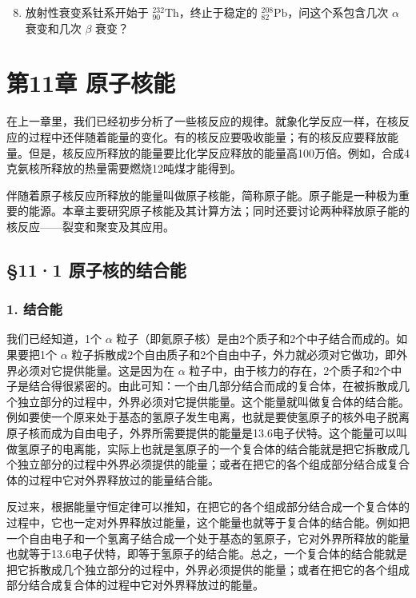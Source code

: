 \begin{enumerate}
\setcounter{enumi}{7}
\item
  放射性衰变系钍系开始于 \(^{232}_{90}\mathrm{Th}\)，终止于稳定的
  \(^{208}_{82}\mathrm{Pb}\)，问这个系包含几次 \(\alpha\) 衰变和几次
  \(\beta\) 衰变？
\end{enumerate}

\chapter{第11章 原子核能}

在上一章里，我们已经初步分析了一些核反应的规律。就象化学反应一样，在核反应的过程中还伴随着能量的变化。有的核反应要吸收能量；有的核反应要释放能量。但是，核反应所释放的能量要比化学反应释放的能量高100万倍。例如，合成4克氨核所释放的热量需要燃烧12吨煤才能得到。

伴随着原子核反应所释放的能量叫做原子核能，简称原子能。原子能是一种极为重要的能源。本章主要研究原子核能及其计算方法；同时还要讨论两种释放原子能的核反应------裂变和聚变及其应用。

\section{§11·1
原子核的结合能}

\subsection{1. 结合能}

我们已经知道，1个 \(\alpha\)
粒子（即氦原子核）是由2个质子和2个中子结合而成的。如果要把1个 \(\alpha\)
粒子拆散成2个自由质子和2个自由中子，外力就必须对它做功，即外界必须对它提供能量。这是因为在
\(\alpha\)
粒子中，由于核力的存在，2个质子和2个中子是结合得很紧密的。由此可知：一个由几部分结合而成的复合体，在被拆散成几个独立部分的过程中，外界必须对它提供能量。这个能量就叫做复合体的结合能。例如要使一个原来处于基态的氢原子发生电离，也就是要使氢原子的核外电子脱离原子核而成为自由电子，外界所需要提供的能量是13.6电子伏特。这个能量可以叫做氢原子的电离能，实际上也就是氢原子的一个复合体的结合能就是把它拆散成几个独立部分的过程中外界必须提供的能量；或者在把它的各个组成部分结合成复合体的过程中它对外界释放过的能量结合能。

反过来，根据能量守恒定律可以推知，在把它的各个组成部分结合成一个复合体的过程中，它也一定对外界释放过能量，这个能量也就等于复合体的结合能。例如把一个自由电子和一个氢离子结合成一个处于基态的氢原子，它对外界所释放的能量也就等于13.6电子伏特，即等于氢原子的结合能。总之，一个复合体的结合能就是把它拆散成几个独立部分的过程中，外界必须提供的能量；或者在把它的各个组成部分结合成复合体的过程中它对外界释放过的能量。

